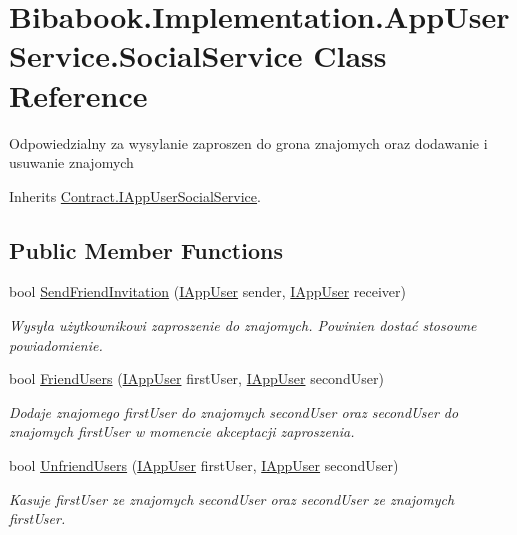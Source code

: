 \hypertarget{class_bibabook_1_1_implementation_1_1_app_user_service_1_1_social_service}{}\section{Bibabook.\+Implementation.\+App\+User\+Service.\+Social\+Service Class Reference}
\label{class_bibabook_1_1_implementation_1_1_app_user_service_1_1_social_service}


Odpowiedzialny za wysylanie zaproszen do grona znajomych oraz dodawanie i usuwanie znajomych  




Inherits \hyperlink{interface_contract_1_1_i_app_user_social_service}{Contract.\+I\+App\+User\+Social\+Service}.

\subsection*{Public Member Functions}
\begin{DoxyCompactItemize}
\item 
bool \hyperlink{class_bibabook_1_1_implementation_1_1_app_user_service_1_1_social_service_aaf752feeda605c795fce919f89af0cb8}{Send\+Friend\+Invitation} (\hyperlink{interface_contract_1_1_i_app_user}{I\+App\+User} sender, \hyperlink{interface_contract_1_1_i_app_user}{I\+App\+User} receiver)
\begin{DoxyCompactList}\small\item\em Wysyła użytkownikowi zaproszenie do znajomych. Powinien dostać stosowne powiadomienie. \end{DoxyCompactList}\item 
bool \hyperlink{class_bibabook_1_1_implementation_1_1_app_user_service_1_1_social_service_a23fbf1f7de5e49ab135259be820f7f29}{Friend\+Users} (\hyperlink{interface_contract_1_1_i_app_user}{I\+App\+User} first\+User, \hyperlink{interface_contract_1_1_i_app_user}{I\+App\+User} second\+User)
\begin{DoxyCompactList}\small\item\em Dodaje znajomego first\+User do znajomych second\+User oraz second\+User do znajomych first\+User w momencie akceptacji zaproszenia. \end{DoxyCompactList}\item 
bool \hyperlink{class_bibabook_1_1_implementation_1_1_app_user_service_1_1_social_service_a61e408d86571a9571b1130395779eba3}{Unfriend\+Users} (\hyperlink{interface_contract_1_1_i_app_user}{I\+App\+User} first\+User, \hyperlink{interface_contract_1_1_i_app_user}{I\+App\+User} second\+User)
\begin{DoxyCompactList}\small\item\em Kasuje first\+User ze znajomych second\+User oraz second\+User ze znajomych first\+User. \end{DoxyCompactList}\end{DoxyCompactItemize}


